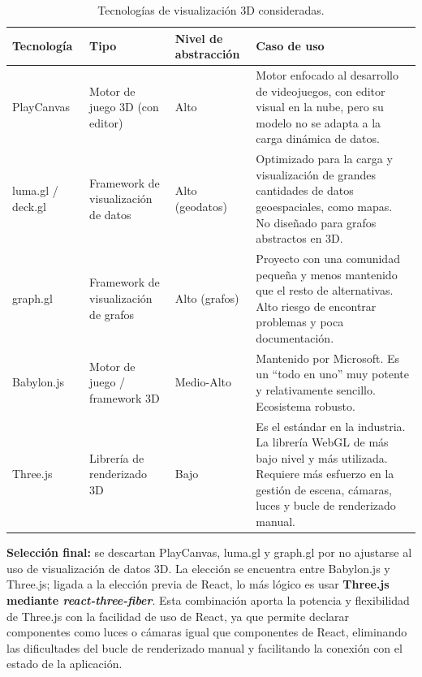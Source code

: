 \begin{table}[H]
	\centering
	\caption{Tecnologías de visualización 3D consideradas.}
	\label{tab:viz3d}
	\small
	\begin{tabularx}{\textwidth}{>{\raggedright\arraybackslash}p{2.4cm} >{\raggedright\arraybackslash}p{2.3cm} >{\raggedright\arraybackslash}p{1.7cm} >{\raggedright\arraybackslash}X}
		\toprule
		\textbf{Tecnología} & \textbf{Tipo} & \textbf{Nivel de abstracción} & \textbf{Caso de uso} \\
		\midrule
		PlayCanvas~\cite{playcanvas} & Motor de juego 3D (con editor) & Alto &
			Motor enfocado al desarrollo de videojuegos, con editor visual en la nube, pero su modelo no
			se adapta a la carga dinámica de datos. \\
		\addlinespace
		luma.gl / deck.gl~\cite{lumagl} & Framework de visualización de datos & Alto (geodatos) &
			Optimizado para la carga y visualización de grandes cantidades de datos geoespaciales, como
			mapas. No diseñado para grafos abstractos en 3D. \\
		\addlinespace
		graph.gl~\cite{graphgl} & Framework de visualización de grafos & Alto (grafos) &
			Proyecto con una comunidad pequeña y menos mantenido que el resto de alternativas. Alto
			riesgo de encontrar problemas y poca documentación. \\
		\addlinespace
		Babylon.js~\cite{babylon} & Motor de juego / framework 3D & Medio-Alto &
			Mantenido por Microsoft. Es un ``todo en uno'' muy potente y relativamente sencillo.
			Ecosistema robusto. \\
		\addlinespace
		Three.js~\cite{threejs} & Librería de renderizado 3D & Bajo &
			Es el estándar en la industria. La librería WebGL de más bajo nivel y más utilizada. Requiere
			más esfuerzo en la gestión de escena, cámaras, luces y bucle de renderizado manual. \\
		\bottomrule
	\end{tabularx}
\end{table}

\textbf{Selección final:} se descartan PlayCanvas, luma.gl y graph.gl por no ajustarse al uso de
visualización de datos 3D. La elección se encuentra entre Babylon.js y Three.js; ligada a la elección
previa de React, lo más lógico es
usar \textbf{Three.js~\cite{threejs} mediante \textit{react-three-fiber}}. Esta combinación aporta la
potencia y flexibilidad de Three.js con la facilidad de uso de React, ya que permite declarar
componentes como luces o cámaras igual que componentes de React, eliminando las dificultades del
bucle de renderizado manual y facilitando la conexión con el estado de la aplicación.

